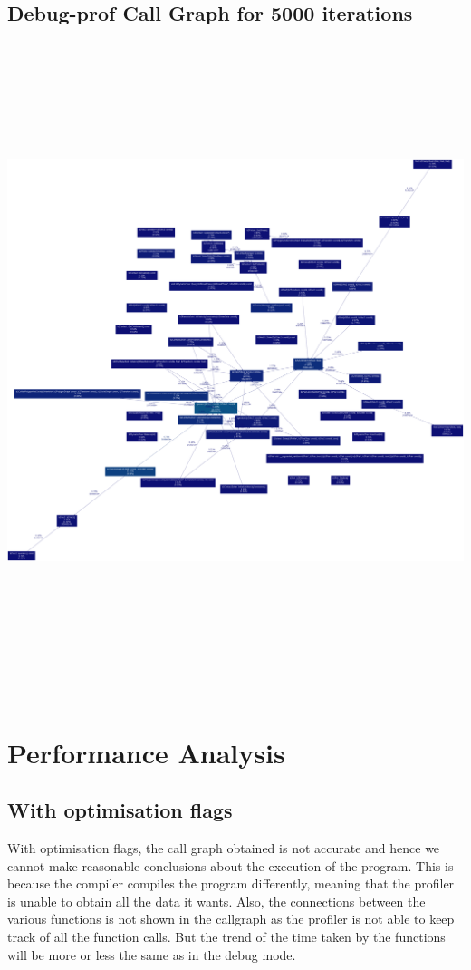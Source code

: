 \documentclass[11pt]{article}
\begin{document}
	\subsection{Debug-prof Call Graph for 5000 iterations}

	\includegraphics[width=525pt, height=525pt]{../plots/graph_5000.png}\\\\

\section{Performance Analysis}

	\subsection{With optimisation flags}
	With optimisation flags, the call graph obtained is not accurate and hence we cannot make reasonable conclusions about the execution of the program. This is because the compiler compiles the program differently, meaning that the profiler is unable to obtain all the data it wants. Also, the connections between the various functions is not shown in the callgraph as the profiler is not able to keep track of all the function calls. But the trend of the time taken by the functions will be more or less the same as in the debug mode.
\end{document}
